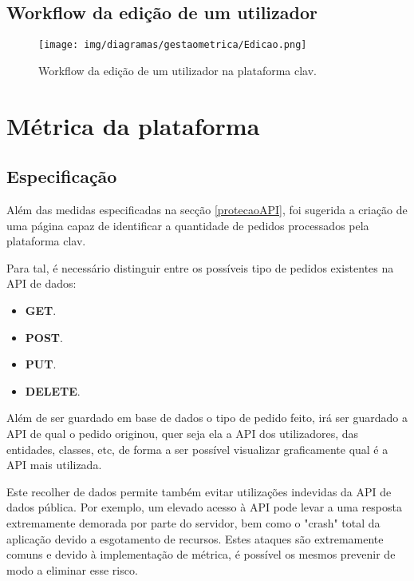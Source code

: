 \cleardoublepage
\subsection{Workflow da edição de um utilizador}

\begin{figure}[h!]
    \centering
    \texttt{[image: img/diagramas/gestaometrica/Edicao.png]}
    \caption{Workflow da edição de um utilizador na plataforma \gls{clav}.}
    \label{fig:flow_Edicao}
\end{figure}

\cleardoublepage
\section{Métrica da plataforma} \label{solucaoMetrica}
\vspace{-4mm}
\subsection{Especificação}
\vspace{-3mm}
Além das medidas especificadas na secção \ref{protecaoAPI}, foi sugerida a criação de uma página capaz de identificar a quantidade de pedidos processados pela plataforma \gls{clav}.

Para tal, é necessário distinguir entre os possíveis tipo de pedidos existentes na API de dados: 
\vspace{-3mm}
\begin{itemize}
    \item \textbf{GET}.
    \vspace{-1.5mm}
    \item \textbf{POST}.
    \vspace{-1.5mm}
    \item \textbf{PUT}.
    \vspace{-1.5mm}
    \item \textbf{DELETE}.
\end{itemize}

\vspace{-1mm}
Além de ser guardado em base de dados o tipo de pedido feito, irá ser guardado a API de qual o pedido originou, quer seja ela a API dos utilizadores, das entidades, classes, etc, de forma a ser possível visualizar graficamente qual é a API mais utilizada.

Este recolher de dados permite também evitar utilizações indevidas da API de dados pública. Por exemplo, um elevado acesso à API pode levar a uma resposta extremamente demorada por parte do servidor, bem como o "crash" total da aplicação devido a esgotamento de recursos. Estes ataques são extremamente comuns e devido à implementação de métrica, é possível os mesmos prevenir de modo a eliminar esse risco.

